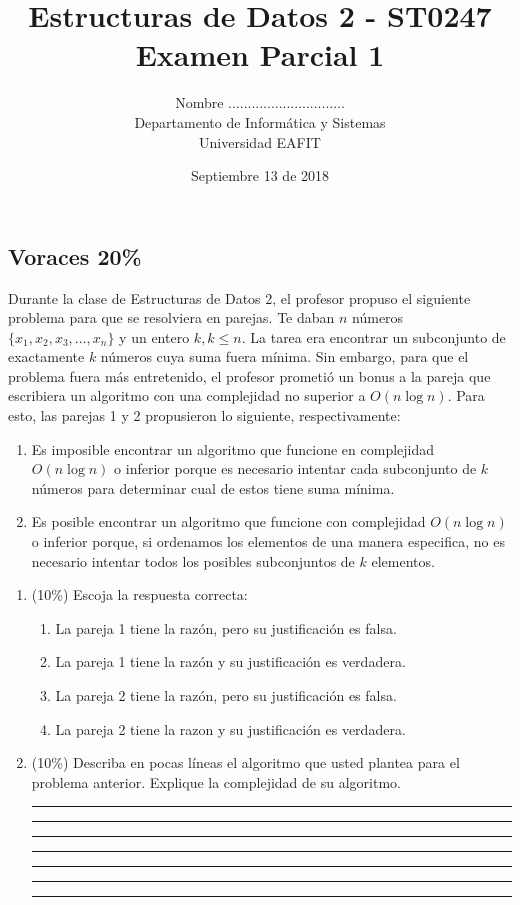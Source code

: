 \documentclass[10 pt]{article}
\title{\textbf {Estructuras de Datos 2 - ST0247\\Examen Parcial 1}}
\author{Nombre ..............................\\
		Departamento de Informática y Sistemas\\
		Universidad EAFIT\\}
\date{Septiembre 13 de 2018}
\begin{document}
\lstset{escapechar=@,style=customc, numbers=left, stepnumber = 1} 
\maketitle
\begin{multicols}{2}
\section{Voraces 20\%}
Durante la clase de Estructuras de Datos 2, el profesor propuso el siguiente problema para que se resolviera en parejas. Te daban $n$ números $\{x_1,x_2,x_3,...,x_n\}$ y un entero $k, k\leq n$. La tarea era encontrar un subconjunto de exactamente $k$ números cuya suma fuera mínima. Sin embargo, para que el problema fuera más entretenido, el profesor prometió un bonus a la pareja que escribiera un algoritmo con una complejidad no superior a $O(n\log n)$. Para esto, las parejas 1 y 2 propusieron lo siguiente, respectivamente:
\begin{enumerate}
	\item Es imposible encontrar un algoritmo que funcione en complejidad $O(n \log n)$ o inferior  porque es necesario intentar cada subconjunto de $k$ números para determinar cual de estos tiene suma mínima.
	\item Es posible encontrar un algoritmo que funcione con complejidad $O(n \log n)$ o inferior porque, si ordenamos los elementos de una manera especifica, no es necesario intentar todos los posibles subconjuntos de $k$ elementos.
\end{enumerate} 
\begin{enumerate}[label=\alph*)]
\item (10\%) Escoja la respuesta correcta:
\begin{enumerate}[label=\roman*)]
	\item La pareja 1 tiene la razón, pero su justificación es falsa.
	\item La pareja 1 tiene la razón y su justificación es verdadera.
	\item La pareja 2 tiene la razón, pero su justificación es falsa.
	\item La pareja 2 tiene la razon y su justificación es verdadera.
\end{enumerate}
\item (10\%) Describa en pocas líneas el algoritmo que usted plantea para el problema anterior. Explique la complejidad de su algoritmo. 
\noindent\rule{9cm}{0.05pt}
\noindent\rule{9cm}{0.05pt}
\noindent\rule{9cm}{0.05pt}
\noindent\rule{9cm}{0.05pt}
\noindent\rule{9cm}{0.05pt}
\noindent\rule{9cm}{0.05pt}
\noindent\rule{9cm}{0.05pt}
\end{enumerate}

\end{multicols}
\end{document}
